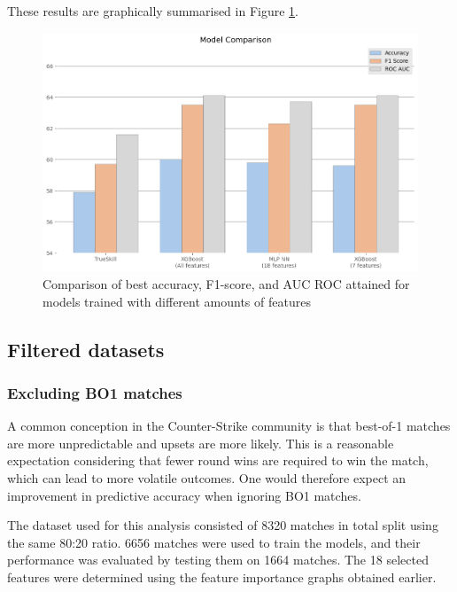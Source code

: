 These results are graphically summarised in Figure \ref{fig:full-data-bars}.

\begin{figure}[h]
	\centering
	\begin{adjustbox}{center}
		\includegraphics[width=1.1\textwidth]{Figures/results-bars.png}
	\end{adjustbox}
	\caption{Comparison of best accuracy, F1-score, and AUC ROC attained for models trained with different amounts of features}
	\label{fig:full-data-bars}
\end{figure}

\subsection{Filtered datasets}

\subsubsection{Excluding BO1 matches}

A common conception in the Counter-Strike community is that best-of-1 matches are more unpredictable and upsets are more likely. This is a reasonable expectation considering that fewer round wins are required to win the match, which can lead to more volatile outcomes. One would therefore expect an improvement in predictive accuracy when ignoring BO1 matches.

The dataset used for this analysis consisted of 8320 matches in total split using the same 80:20 ratio. 6656 matches were used to train the models, and their performance was evaluated by testing them on 1664 matches. The 18 selected features were determined using the feature importance graphs obtained earlier.

